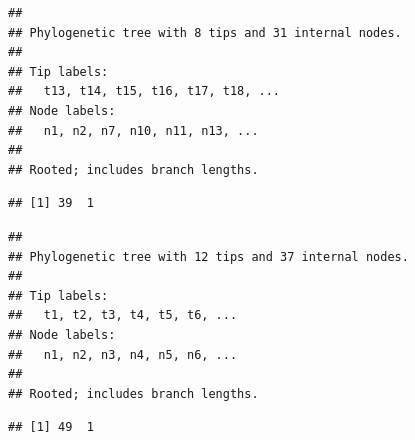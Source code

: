 \documentclass[
]{book}
\newenvironment{Shaded}{\begin{snugshade}}{\end{snugshade}}
\newcommand{\CommentTok}[1]{\textcolor[rgb]{0.56,0.35,0.01}{\textit{#1}}}
\newcommand{\DataTypeTok}[1]{\textcolor[rgb]{0.13,0.29,0.53}{#1}}
\newcommand{\KeywordTok}[1]{\textcolor[rgb]{0.13,0.29,0.53}{\textbf{#1}}}
\newcommand{\NormalTok}[1]{#1}
\newcommand{\OperatorTok}[1]{\textcolor[rgb]{0.81,0.36,0.00}{\textbf{#1}}}
\newcommand{\StringTok}[1]{\textcolor[rgb]{0.31,0.60,0.02}{#1}}
\begin{document}
\begin{verbatim}
## 
## Phylogenetic tree with 8 tips and 31 internal nodes.
## 
## Tip labels:
##   t13, t14, t15, t16, t17, t18, ...
## Node labels:
##   n1, n2, n7, n10, n11, n13, ...
## 
## Rooted; includes branch lengths.
\end{verbatim}

\begin{Shaded}
\end{Shaded}

\begin{verbatim}
## [1] 39  1
\end{verbatim}

\begin{Shaded}
\end{Shaded}

\begin{verbatim}
## 
## Phylogenetic tree with 12 tips and 37 internal nodes.
## 
## Tip labels:
##   t1, t2, t3, t4, t5, t6, ...
## Node labels:
##   n1, n2, n3, n4, n5, n6, ...
## 
## Rooted; includes branch lengths.
\end{verbatim}

\begin{Shaded}
\end{Shaded}

\begin{verbatim}
## [1] 49  1
\end{verbatim}

\begin{Shaded}
\end{Shaded}
\end{document}

